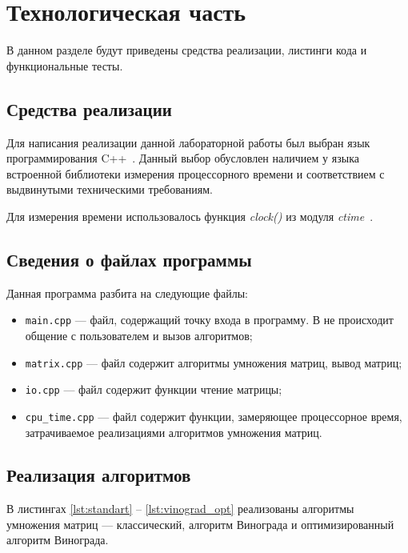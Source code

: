 \chapter{Технологическая часть}

В данном разделе будут приведены средства реализации, листинги кода и функциональные тесты.

\section{Средства реализации}

Для написания реализации данной лабораторной работы был выбран язык программирования C++~\cite{cpp-lang}.
Данный выбор обусловлен наличием у языка встроенной библиотеки измерения процессорного времени и соответствием с выдвинутыми техническими требованиям.

Для измерения времени использовалось функция \textit{clock()} из модуля \textit{ctime}~\cite{cpp-lang-time}.

\clearpage

\section{Сведения о файлах программы}

Данная программа разбита на следующие файлы:

\begin{itemize}[label=---]
	\item \texttt{main.cpp} --- файл, содержащий точку входа в программу. В не происходит общение с пользователем и вызов алгоритмов;
	\item \texttt{matrix.cpp} --- файл содержит алгоритмы умножения матриц, вывод матриц;
	\item \texttt{io.cpp} --- файл содержит функции чтение матрицы;
	\item \texttt{cpu\_time.cpp} --- файл содержит функции, замеряющее процессорное время, затрачиваемое реализациями алгоритмов умножения матриц.
\end{itemize}

\section{Реализация алгоритмов}

В листингах \ref{lst:standart} -- \ref{lst:vinograd_opt} реализованы алгоритмы умножения матриц --- классический, алгоритм Винограда и оптимизированный алгоритм Винограда.

